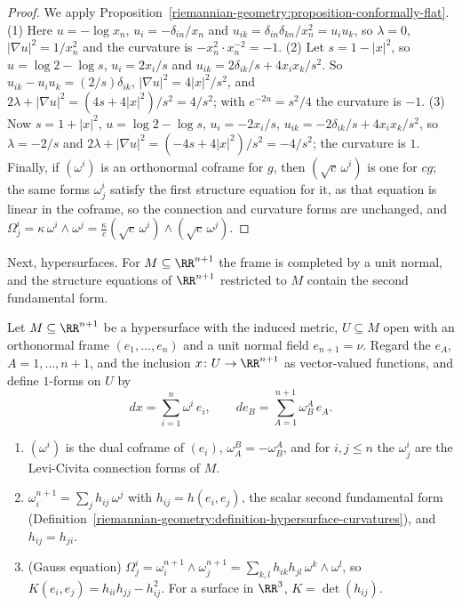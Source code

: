 \begin{proof}
We apply Proposition~\ref{riemannian-geometry:proposition-conformally-flat}. (1) Here $u = -\log x_n$, $u_i = -\delta_{in}/x_n$ and $u_{ik} = \delta_{in}\delta_{kn}/x_n^2 = u_iu_k$, so $\lambda = 0$,
$|\nabla u|^2 = 1/x_n^2$ and the curvature is $-x_n^2 \cdot x_n^{-2} = -1$. (2) Let $s = 1 - |x|^2$, so $u = \log2 - \log s$, $u_i = 2x_i/s$ and $u_{ik} = 2\delta_{ik}/s + 4x_ix_k/s^2$. So
$u_{ik} - u_iu_k = (2/s)\delta_{ik}$, $|\nabla u|^2 = 4|x|^2/s^2$, and $2\lambda + |\nabla u|^2 = (4s + 4|x|^2)/s^2 = 4/s^2$; with $e^{-2u} = s^2/4$ the curvature is $-1$. (3) Now $s = 1 + |x|^2$,
$u = \log2 - \log s$, $u_i = -2x_i/s$, $u_{ik} = -2\delta_{ik}/s + 4x_ix_k/s^2$, so $\lambda = -2/s$ and $2\lambda + |\nabla u|^2 = (-4s + 4|x|^2)/s^2 = -4/s^2$; the curvature is $1$. Finally, if
$(\omega^i)$ is an orthonormal coframe for $g$, then $(\sqrt c\,\omega^i)$ is one for $cg$; the same forms $\omega^i_j$ satisfy the first structure equation for it, as that equation is linear
in the coframe, so the connection and curvature forms are unchanged, and $\Omega^i_j = \kappa\,\omega^i \wedge \omega^j = \frac{\kappa}{c}(\sqrt c\,\omega^i) \wedge (\sqrt c\,\omega^j)$.
\end{proof}

Next, hypersurfaces. For $M \subseteq \RR^{n+1}$ the frame is completed by a unit normal, and the structure equations of $\RR^{n+1}$ restricted to $M$ contain the second fundamental form.

\begin{proposition}\label{riemannian-geometry:proposition-hypersurface-frames}
Let $M \subseteq \RR^{n+1}$ be a hypersurface with the induced metric, $U \subseteq M$ open with an orthonormal frame $(e_1, \ldots, e_n)$ and a unit normal field $e_{n+1} = \nu$. Regard the $e_A$,
$A = 1, \ldots, n + 1$, and the inclusion $x \colon U \to \RR^{n+1}$ as vector-valued functions, and define $1$-forms on $U$ by
\[
dx = \sum_{i=1}^n\omega^i\,e_i, \qquad de_B = \sum_{A=1}^{n+1}\omega^A_B\,e_A .
\]
\begin{enumerate}
\item $(\omega^i)$ is the dual coframe of $(e_i)$, $\omega^B_A = -\omega^A_B$, and for $i, j \leq n$ the $\omega^i_j$ are the Levi-Civita connection forms of $M$.
\item $\omega^{n+1}_i = \sum_jh_{ij}\,\omega^j$ with $h_{ij} = h(e_i, e_j)$, the scalar second fundamental form (Definition~\ref{riemannian-geometry:definition-hypersurface-curvatures}), and $h_{ij} = h_{ji}$.
\item (Gauss equation) $\Omega^i_j = \omega^{n+1}_i \wedge \omega^{n+1}_j = \sum_{k,l}h_{ik}h_{jl}\,\omega^k \wedge \omega^l$, so $K(e_i, e_j) = h_{ii}h_{jj} - h_{ij}^2$. For a surface in $\RR^3$, $K = \det(h_{ij})$.
\end{enumerate}
\end{proposition}

